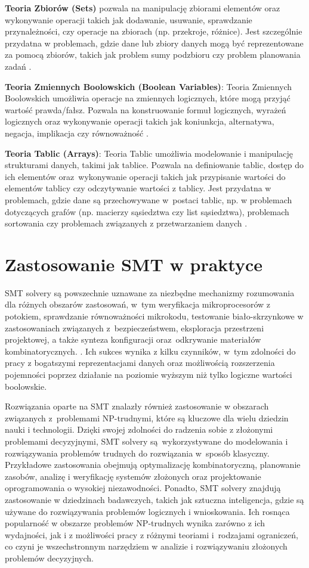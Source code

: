 \textbf{Teoria Zbiorów (Sets)} pozwala na manipulację zbiorami elementów oraz wykonywanie operacji takich jak dodawanie, usuwanie, sprawdzanie przynależności, czy operacje na zbiorach (np. przekroje, różnice). Jest szczególnie przydatna w problemach, gdzie dane lub zbiory danych mogą być reprezentowane za pomocą zbiorów, takich jak problem sumy podzbioru czy problem planowania zadań \cite{Smith09}.

\textbf{Teoria Zmiennych Boolowskich (Boolean Variables)}:
Teoria Zmiennych Boolowskich umożliwia operacje na zmiennych logicznych, które mogą przyjąć wartość prawda/fałsz. Pozwala na konstruowanie formuł logicznych, wyrażeń logicznych oraz wykonywanie operacji takich jak koniunkcja, alternatywa, negacja, implikacja czy równoważność \cite{Bryant92}. 

\textbf{Teoria Tablic (Arrays)}:
Teoria Tablic umożliwia modelowanie i manipulację strukturami danych, takimi jak tablice. Pozwala na definiowanie tablic, dostęp do ich elementów oraz~wykonywanie operacji takich jak przypisanie wartości do elementów tablicy czy odczytywanie wartości z tablicy. Jest przydatna w problemach, gdzie dane są przechowywane w~postaci tablic, np. w problemach dotyczących grafów (np. macierzy sąsiedztwa czy list sąsiedztwa), problemach sortowania czy problemach związanych z przetwarzaniem danych \cite{CormenLRS0023376}.

\section{Zastosowanie SMT w praktyce}
SMT solvery są powszechnie uznawane za niezbędne mechanizmy rozumowania dla różnych obszarów zastosowań, w~tym weryfikacja mikroprocesorów z potokiem, sprawdzanie równoważności mikrokodu, testowanie biało-skrzynkowe w zastosowaniach związanych z~bezpieczeństwem, eksploracja przestrzeni projektowej, a także synteza konfiguracji oraz~odkrywanie materiałów kombinatorycznych. \cite{BarbosaBBKLMMMN22}. Ich sukces wynika z kilku czynników, w~tym zdolności do pracy z bogatszymi reprezentacjami danych oraz możliwością rozszerzenia pojemności poprzez działanie na poziomie wyższym niż tylko logiczne wartości boolowskie. 

Rozwiązania oparte na SMT znalazły również zastosowanie w obszarach związanych z~problemami NP-trudnymi, które są kluczowe dla wielu dziedzin nauki i technologii. Dzięki swojej zdolności do radzenia sobie z złożonymi problemami decyzyjnymi, SMT solvery są~wykorzystywane do modelowania i rozwiązywania problemów trudnych do rozwiązania w~sposób klasyczny. Przykładowe zastosowania obejmują optymalizację kombinatoryczną, planowanie zasobów, analizę i weryfikację systemów złożonych oraz projektowanie oprogramowania o wysokiej niezawodności. Ponadto, SMT solvery znajdują zastosowanie w dziedzinach badawczych, takich jak sztuczna inteligencja, gdzie są używane do rozwiązywania problemów logicznych i wnioskowania. Ich rosnąca popularność w obszarze problemów NP-trudnych wynika zarówno z ich wydajności, jak i z możliwości pracy z różnymi teoriami i~rodzajami ograniczeń, co czyni je wszechstronnym narzędziem w analizie i rozwiązywaniu złożonych problemów decyzyjnych.
